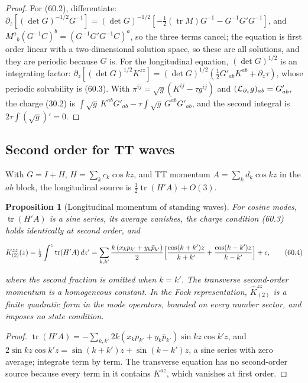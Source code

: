 \documentclass[11pt]{article}
\newtheorem{proposition}[theorem]{Proposition}
\theoremstyle{remark}
\begin{document}
\begin{proof}
For (60.2), differentiate: \(\partial_z[(\det G)^{-1/2}G^{-1}]
=(\det G)^{-1/2}[-\tfrac12(\operatorname{tr}M)G^{-1}-G^{-1}G'G^{-1}]\),
and \(M^a{}_b(G^{-1}C)^b=(G^{-1}G'G^{-1}C)^a\), so the three terms cancel;
the equation is first order linear with a two-dimensional solution
space, so these are all solutions, and they are periodic because
\(G\) is.  For the longitudinal equation, \((\det G)^{1/2}\) is an
integrating factor:
\(\partial_z[(\det G)^{1/2}K^{zz}]=(\det G)^{1/2}(\tfrac12G'_{ab}K^{ab}+\partial_z\tau)\),
whose periodic solvability is (60.3).  With \(\pi^{ij}=\sqrt g(K^{ij}-\tau g^{ij})\)
and \(({\cal L}_{\partial_z}g)_{ab}=G'_{ab}\), the charge (30.2) is
\(\int\sqrt g\,K^{ab}G'_{ab}-\tau\int\sqrt g\,G^{ab}G'_{ab}\), and the
second integral is \(2\tau\int(\sqrt g)'=0\).
\end{proof}

\subsection{Second order for TT waves}

With \(G=I+H\), \(H=\sum_kc_k\cos kz\), and TT momentum
\(A=\sum_kd_k\cos kz\) in the \(ab\) block, the longitudinal source is
\(\tfrac12\operatorname{tr}(H'A)+O(3)\).

\begin{proposition}[Longitudinal momentum of standing waves]
\label{prop:v19v57-standing}
For cosine modes, \(\operatorname{tr}(H'A)\) is a sine series, its
average vanishes, the charge condition (60.3) holds identically at
second order, and

\[
 K^{zz}_{(2)}(z)=\tfrac12\int^z\operatorname{tr}(H'A)\,dz'
 =\sum_{k,k'}\frac{k\,(x_kp_{k'}+y_k\bar p_{k'})}{2}
 \Bigl[\frac{\cos(k+k')z}{k+k'}+\frac{\cos(k-k')z}{k-k'}\Bigr]+c,
                                                                    \tag{60.4}
\]

where the second fraction is omitted when \(k=k'\).  The transverse second-order momentum
is a homogeneous constant.  In the Fock representation,
\(\widehat K^{zz}_{(2)}\) is a finite quadratic form in the mode
operators, bounded on every number sector, and imposes no state
condition.
\end{proposition}

\begin{proof}
\(\operatorname{tr}(H'A)=-\sum_{k,k'}2k(x_kp_{k'}+y_k\bar p_{k'})\sin kz\cos k'z\),
and \(2\sin kz\cos k'z=\sin(k+k')z+\sin(k-k')z\), a sine series with
zero average; integrate term by term.  The transverse equation has no
second-order source because every term in it contains \(K^{az}\), which
vanishes at first order.
\end{proof}
\end{document}
